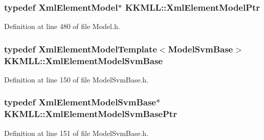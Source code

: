 \subsubsection[{\texorpdfstring{Xml\+Element\+Model\+Ptr}{XmlElementModelPtr}}]{\setlength{\rightskip}{0pt plus 5cm}typedef {\bf Xml\+Element\+Model}$\ast$ {\bf K\+K\+M\+L\+L\+::\+Xml\+Element\+Model\+Ptr}}\hypertarget{namespace_k_k_m_l_l_afb9453cdd3686eead5b3d43219c76528}{}\label{namespace_k_k_m_l_l_afb9453cdd3686eead5b3d43219c76528}


Definition at line 480 of file Model.\+h.

\subsubsection[{\texorpdfstring{Xml\+Element\+Model\+Svm\+Base}{XmlElementModelSvmBase}}]{\setlength{\rightskip}{0pt plus 5cm}typedef {\bf Xml\+Element\+Model\+Template}$<${\bf Model\+Svm\+Base}$>$ {\bf K\+K\+M\+L\+L\+::\+Xml\+Element\+Model\+Svm\+Base}}\hypertarget{namespace_k_k_m_l_l_a2bebbf479e12513fc49210862bd87d22}{}\label{namespace_k_k_m_l_l_a2bebbf479e12513fc49210862bd87d22}


Definition at line 150 of file Model\+Svm\+Base.\+h.

\subsubsection[{\texorpdfstring{Xml\+Element\+Model\+Svm\+Base\+Ptr}{XmlElementModelSvmBasePtr}}]{\setlength{\rightskip}{0pt plus 5cm}typedef {\bf Xml\+Element\+Model\+Svm\+Base}$\ast$ {\bf K\+K\+M\+L\+L\+::\+Xml\+Element\+Model\+Svm\+Base\+Ptr}}\hypertarget{namespace_k_k_m_l_l_aded013be093ad730f02dff68389f923a}{}\label{namespace_k_k_m_l_l_aded013be093ad730f02dff68389f923a}


Definition at line 151 of file Model\+Svm\+Base.\+h.

